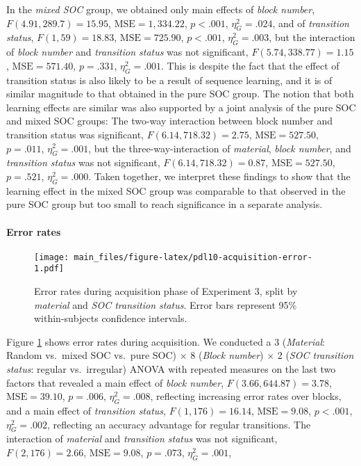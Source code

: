 \documentclass[jou]{apa6}
\theoremstyle{definition}
\theoremstyle{definition}
\theoremstyle{definition}
\theoremstyle{remark}
\begin{document}
In the \emph{mixed SOC} group, we obtained only main effects of
\emph{block number}, \(F(4.91, 289.7) = 15.95\),
\(\mathrm{MSE} = 1,334.22\), \(p < .001\), \(\eta^2_G = .024\), and of
\emph{transition status}, \(F(1, 59) = 18.83\),
\(\mathrm{MSE} = 725.90\), \(p < .001\), \(\eta^2_G = .003\), but the
interaction of \emph{block number} and \emph{transition status} was not
significant, \(F(5.74, 338.77) = 1.15\), \(\mathrm{MSE} = 571.40\),
\(p = .331\), \(\eta^2_G = .001\). This is despite the fact that the
effect of transition status is also likely to be a result of sequence
learning, and it is of similar magnitude to that obtained in the pure
SOC group. The notion that both learning effects are similar was also
supported by a joint analysis of the pure SOC and mixed SOC groups: The
two-way interaction between block number and transition status was
significant, \(F(6.14, 718.32) = 2.75\), \(\mathrm{MSE} = 527.50\),
\(p = .011\), \(\eta^2_G = .001\), but the three-way-interaction of
\emph{material}, \emph{block number}, and \emph{transition status} was
not significant, \(F(6.14, 718.32) = 0.87\), \(\mathrm{MSE} = 527.50\),
\(p = .521\), \(\eta^2_G = .000\). Taken together, we interpret these
findings to show that the learning effect in the mixed SOC group was
comparable to that observed in the pure SOC group but too small to reach
significance in a separate analysis.

\paragraph{Error rates}\label{error-rates-2}

\begin{figure}[htbp]
\centering
\texttt{[image: main\_files/figure-latex/pdl10-acquisition-error-1.pdf]}
\caption{\label{fig:pdl10-acquisition-error}Error rates during acquisition
phase of Experiment 3, split by \emph{material} and \emph{SOC transition
status}. Error bars represent 95\% within-subjects confidence
intervals.}
\end{figure}

Figure \ref{fig:pdl10-acquisition-error} shows error rates during
acquisition. We conducted a 3 (\emph{Material}: Random vs.~mixed SOC
vs.~pure SOC) \(\times\) 8 (\emph{Block number}) \(\times\) 2 (\emph{SOC
transition status}: regular vs.~irregular) ANOVA with repeated measures
on the last two factors that revealed a main effect of \emph{block
number}, \(F(3.66, 644.87) = 3.78\), \(\mathrm{MSE} = 39.10\),
\(p = .006\), \(\eta^2_G = .008\), reflecting increasing error rates
over blocks, and a main effect of \emph{transition status},
\(F(1, 176) = 16.14\), \(\mathrm{MSE} = 9.08\), \(p < .001\),
\(\eta^2_G = .002\), reflecting an accuracy advantage for regular
transitions. The interaction of \emph{material} and \emph{transition
status} was not significant, \(F(2, 176) = 2.66\),
\(\mathrm{MSE} = 9.08\), \(p = .073\), \(\eta^2_G = .001\),
\end{document}
